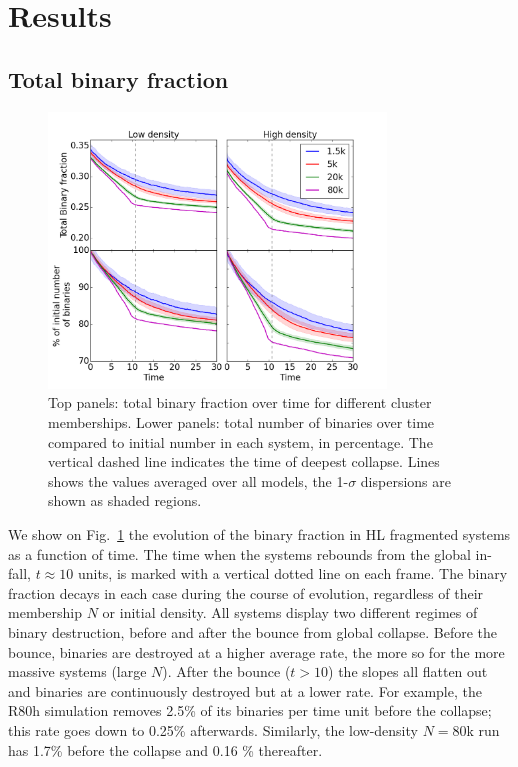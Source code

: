 \section{Results}


\subsection{Total binary fraction}



\begin{figure}
\begin{center}
\includegraphics[width=0.8\textwidth]{Figures/6_TotBinFrac_vs_time_dispersion}
\caption[Evolution of the total binary fraction and percentage of initial population]{ Top panels: total binary fraction over time for different cluster memberships. Lower panels: total number of binaries over time compared to initial number in each system, in percentage. The vertical dashed line indicates the time of deepest collapse. Lines shows the values averaged over all models, the 1-$\sigma$ dispersions are shown as shaded regions. }
\label{Fig:6_TotBinFrac}
\end{center}
\end{figure}

We show on Fig.~\ref{Fig:6_TotBinFrac} the evolution of the binary fraction in HL fragmented systems as a function of time. The time when the systems rebounds from the global in-fall, $t \approx 10$ units, is marked with a vertical dotted line on each frame. The binary fraction decays in each case during the course of evolution, regardless of their membership $N$ or initial density. 
All systems display two different regimes of binary destruction, before and after the bounce from global collapse. Before the bounce, binaries are destroyed at a higher average rate, the more so for the more massive systems (large $N$). 
After the bounce ($t > 10$) the slopes all flatten out and binaries are continuously destroyed but at a lower rate. For example, the R80h simulation removes 2.5\% of its binaries per time unit before the collapse; this rate goes down to 0.25\% afterwards. Similarly, the low-density $N = 80$k run has  1.7\% before the collapse and 0.16 \% thereafter.



